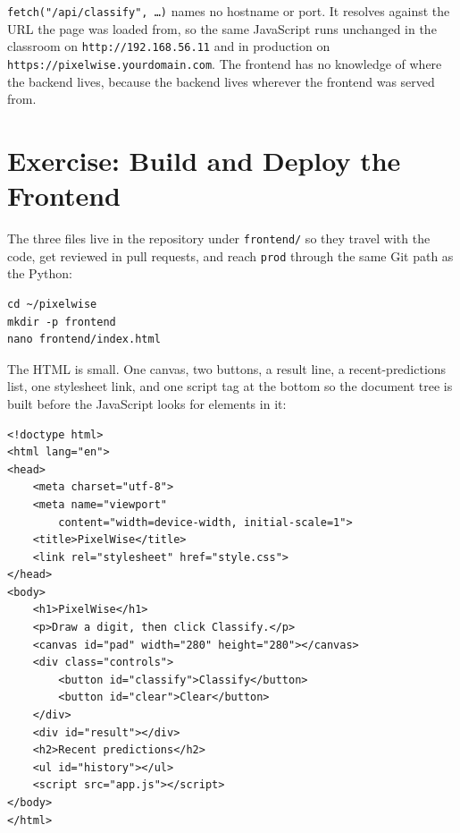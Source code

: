 

\texttt{fetch("/api/classify", \dots)} names no hostname or port.
It resolves against the URL the page was loaded from, so the same
JavaScript runs unchanged in the classroom on
\texttt{http://192.168.56.11} and in production on
\texttt{https://pixelwise.yourdomain.com}.
The frontend has no knowledge of where the backend lives, because the
backend lives wherever the frontend was served from.

\newpage
\section{Exercise: Build and Deploy the Frontend}

The three files live in the repository under \texttt{frontend/} so they
travel with the code, get reviewed in pull requests, and reach
\texttt{prod} through the same Git path as the Python:

\begin{verbatim}
cd ~/pixelwise
mkdir -p frontend
nano frontend/index.html
\end{verbatim}

The HTML is small.
One canvas, two buttons, a result line, a recent-predictions list, one
stylesheet link, and one script tag at the bottom so the document tree is
built before the JavaScript looks for elements in it:

\begin{verbatim}
<!doctype html>
<html lang="en">
<head>
    <meta charset="utf-8">
    <meta name="viewport"
        content="width=device-width, initial-scale=1">
    <title>PixelWise</title>
    <link rel="stylesheet" href="style.css">
</head>
<body>
    <h1>PixelWise</h1>
    <p>Draw a digit, then click Classify.</p>
    <canvas id="pad" width="280" height="280"></canvas>
    <div class="controls">
        <button id="classify">Classify</button>
        <button id="clear">Clear</button>
    </div>
    <div id="result"></div>
    <h2>Recent predictions</h2>
    <ul id="history"></ul>
    <script src="app.js"></script>
</body>
</html>
\end{verbatim}

